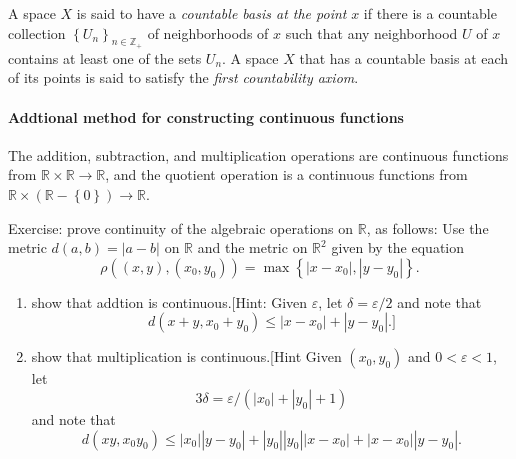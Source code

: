 \begin{definition}
  A space \( X \) is said to have a \emph{countable basis at the point} \( x \) if there is a countable collection \( \left\lbrace U_n \right\rbrace_{n \in \mathbb{Z}_+} \) of neighborhoods of \( x \) such that any neighborhood \( U \) of \( x \) contains at least one of the sets \( U_n \).
  A space \( X \) that has a countable basis at each of its points is said to satisfy the \emph{first countability axiom}.
\end{definition}

\paragraph{Addtional method for constructing continuous functions}

\begin{lemma}
  The addition, subtraction, and multiplication operations are continuous functions from \( \mathbb{R} \times \mathbb{R} \to \mathbb{R} \), and the quotient operation is a continuous functions from \( \mathbb{R} \times (\mathbb{R} - \left\lbrace 0 \right\rbrace) \to \mathbb{R} \).
\end{lemma}
\begin{remark}
  Exercise: prove continuity of the algebraic operations on \( \mathbb{R} \), as follows: Use the metric \( d(a, b) = \left\vert a - b \right\vert \) on \( \mathbb{R} \) and the metric on \( \mathbb{R}^2 \) given by the equation
  \[
    \rho((x, y), (x_0, y_0)) = \max \left\lbrace \left\vert x - x_0 \right\vert, \left\vert y - y_0 \right\vert \right\rbrace.
  \]
  \begin{enumerate}
    \item show that addtion is continuous.[Hint: Given \( \varepsilon \), let \( \delta = \varepsilon / 2 \) and note that
      \[
        d(x + y, x_0 + y_0) \leq \left\vert x - x_0 \right\vert + \left\vert y - y_0 \right\vert.]
      \]
    \item show that multiplication is continuous.[Hint Given \( (x_0, y_0) \) and \( 0 < \varepsilon < 1 \), let
      \[
        3\delta = \varepsilon / ( \left\vert x_0 \right\vert + \left\vert y_0 \right\vert + 1 )
      \]
      and note that
      \[
        d(xy, x_0 y_0) \leq \left\vert x_0 \right\vert \left\vert y - y_0 \right\vert + \left\vert y_0 \right\vert \left\vert y_0 \right\vert \left\vert x - x_0 \right\vert + \left\vert x - x_0 \right\vert \left\vert y - y_0 \right\vert.
      \]
  \end{enumerate}
\end{remark}

